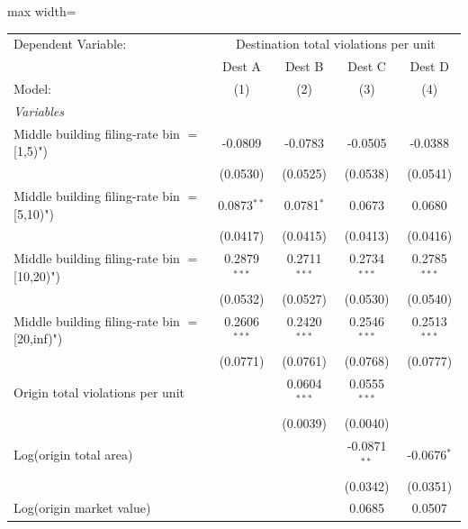 \documentclass[
  11pt,
]{article}
\begin{document}
\begin{adjustbox}{max width=\textwidth}
\begingroup
\centering
\begin{tabular}{lcccc}
   \tabularnewline \midrule \midrule
   Dependent Variable: & \multicolumn{4}{c}{Destination total violations per unit}\\
                                                  & Dest A         & Dest B         & Dest C         & Dest D \\   
   Model:                                         & (1)            & (2)            & (3)            & (4)\\  
   \midrule
   \emph{Variables}\\
   Middle building filing-rate bin $=$ [1,5)")    & -0.0809        & -0.0783        & -0.0505        & -0.0388\\   
                                                  & (0.0530)       & (0.0525)       & (0.0538)       & (0.0541)\\   
   Middle building filing-rate bin $=$ [5,10)")   & 0.0873$^{**}$  & 0.0781$^{*}$   & 0.0673         & 0.0680\\   
                                                  & (0.0417)       & (0.0415)       & (0.0413)       & (0.0416)\\   
   Middle building filing-rate bin $=$ [10,20)")  & 0.2879$^{***}$ & 0.2711$^{***}$ & 0.2734$^{***}$ & 0.2785$^{***}$\\   
                                                  & (0.0532)       & (0.0527)       & (0.0530)       & (0.0540)\\   
   Middle building filing-rate bin $=$ [20,inf)") & 0.2606$^{***}$ & 0.2420$^{***}$ & 0.2546$^{***}$ & 0.2513$^{***}$\\   
                                                  & (0.0771)       & (0.0761)       & (0.0768)       & (0.0777)\\   
   Origin total violations per unit               &                & 0.0604$^{***}$ & 0.0555$^{***}$ &   \\   
                                                  &                & (0.0039)       & (0.0040)       &   \\   
   Log(origin total area)                         &                &                & -0.0871$^{**}$ & -0.0676$^{*}$\\   
                                                  &                &                & (0.0342)       & (0.0351)\\   
   Log(origin market value)                       &                &                & 0.0685         & 0.0507\\   

\end{tabular}
\end{adjustbox}
\end{document}
